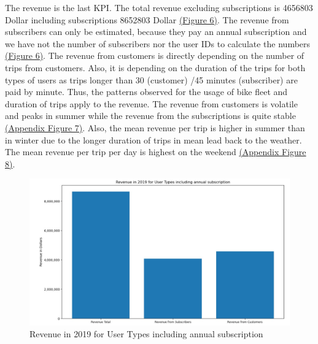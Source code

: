 The revenue is the last KPI. The total revenue excluding subscriptions is 4656803 Dollar including subscriptions 8652803 Dollar \hyperref[fig_revenue_1]{(Figure 6)}. The revenue from subscribers can only be estimated, because they pay an annual subscription and we have not the number of subscribers nor the user IDs to calculate the numbers \hyperref[fig_revenue_1]{(Figure 6)}. The revenue from customers is directly depending on the number of trips from customers. Also, it is depending on the duration of the trips for both types of users as trips longer than 30 (customer) /45 minutes (subscriber) are paid by minute. Thus, the patterns observed for the usage of bike fleet and duration of trips apply to the revenue. The revenue from customers is volatile and peaks in summer while the revenue from the subscriptions is quite stable \hyperref[fig_revenue_2]{(Appendix Figure 7)}. Also, the mean revenue per trip is higher in summer than in winter due to the longer duration of trips in mean lead back to the weather. The mean revenue per trip per day is highest on the weekend \hyperref[fig_revenue_3]{(Appendix Figure 8)}. 

\begin{figure}[H]
    \centering
    \includegraphics[width=0.7\linewidth]{./Figures/Revenue_annual.jpeg}
    \caption{Revenue in 2019 for User Types including annual subscription}
    \label{fig_revenue_1}
\end{figure}